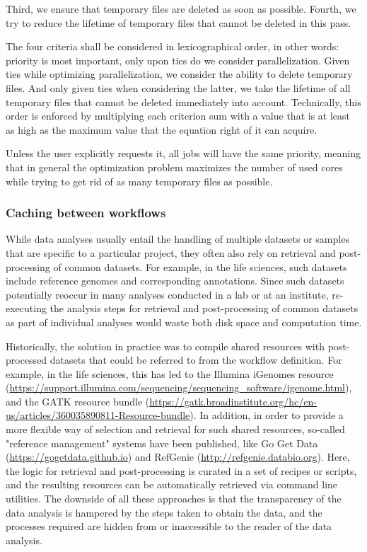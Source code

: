 \documentclass[parskip=half]{scrartcl}
\let\plainurl\url
\renewcommand{\url}[1]{\protect\plainurl{#1}}
\begin{document}
Third, we ensure that temporary files are deleted as soon as possible.
Fourth, we try to reduce the lifetime of temporary files that cannot be deleted in this pass.

The four criteria shall be considered in lexicographical order, in other words: priority is most important, only upon ties do we consider parallelization.
Given ties while optimizing parallelization, we consider the ability to delete temporary files.
And only given ties when considering the latter, we take the lifetime of all temporary files that cannot be deleted immediately into account.
Technically, this order is enforced by multiplying each criterion sum with a value that is at least as high as the maximum value that the equation right of it can acquire.

Unless the user explicitly requests it, all jobs will have the same priority, meaning that in general the optimization problem maximizes the number of used cores while trying to get rid of as many temporary files as possible.

\subsubsection{Caching between workflows}

While data analyses usually entail the handling of multiple datasets or samples that are specific to a particular project, they often also rely on retrieval and post-processing of common datasets.
For example, in the life sciences, such datasets include reference genomes and corresponding annotations.
Since such datasets potentially reoccur in many analyses conducted in a lab or at an institute, re-executing the  analysis steps for retrieval and post-processing of common datasets as part of individual analyses would waste both disk space and computation time.

Historically, the solution in practice was to compile shared resources with post-processed datasets that could be referred to from the workflow definition.
For example, in the life sciences, this has led to the Illumina iGenomes resource (\url{https://support.illumina.com/sequencing/sequencing\_software/igenome.html}), and the GATK resource bundle (\url{https://gatk.broadinstitute.org/hc/en-us/articles/360035890811-Resource-bundle}).
In addition, in order to provide a more flexible way of selection and retrieval for such shared resources, so-called "reference management" systems have been published, like Go Get Data (\url{https://gogetdata.github.io}) and RefGenie (\url{http://refgenie.databio.org}).
Here, the logic for retrieval and post-processing is curated in a set of recipes or scripts, and the resulting resources can be automatically retrieved via command line utilities.
The downside of all these approaches is that the transparency of the data analysis is hampered by the steps taken to obtain the data, and the processes required are hidden from or inaccessible to the reader of the data analysis.
\end{document}
